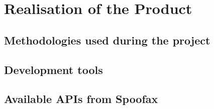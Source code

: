\section{Realisation of the Product}
\label{sec:realisation-product}

\subsection{Methodologies used during the project}
\label{ssec:methodologies}

\subsection{Development tools}
\label{ssec:tools}

\subsection{Available APIs from Spoofax}
\label{ssec:available-apis-from}

